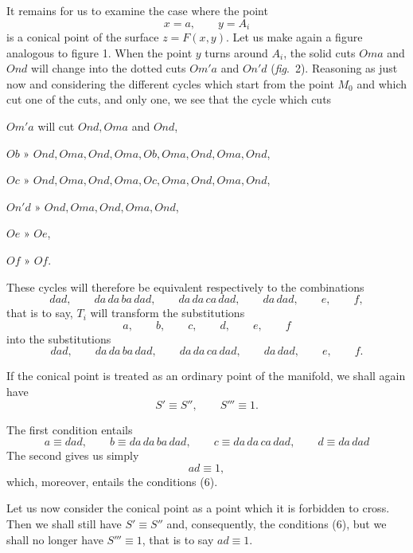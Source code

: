 \documentclass{article}
\begin{document}
It remains for us to examine the case where the point
\[ x = a, \qquad y = A_{i} \]
is a conical point of the surface $z = F(x, y)$. Let us make again a figure analogous to figure 1. When the point $y$ turns around $A_{i}$, the solid cuts $Oma$ and $Ond$ will change into the dotted cuts $Om'a$ and $On'd$ (\emph{fig}.\ 2). Reasoning
as just now and considering the different cycles
which start from the point $M_{0}$ and which cut one of the cuts, and only one, we see that the cycle which cuts

$Om'a$ will cut $Ond, Oma$ and $Ond$,

$Ob$ » $Ond, Oma, Ond, Oma, Ob, Oma, Ond, Oma, Ond$,

$Oc$ » $Ond, Oma, Ond, Oma, Oc, Oma, Ond, Oma, Ond$,

$On'd$ » $Ond, Oma, Ond, Oma, Ond$,

$Oe$ » $Oe$,

$Of$ » $Of$.

These cycles will therefore be equivalent respectively to the combinations
\[ dad, \qquad da\,da\,ba\,dad, \qquad da\,da\,ca\,dad, \qquad da\,dad, \qquad e, \qquad f, \]
that is to say, $T_{i}$ will transform the substitutions
\[ a, \qquad b, \qquad c, \qquad d, \qquad e, \qquad f \]
into the substitutions
\[ dad, \qquad da\,da\,ba\,dad, \qquad da\,da\,ca\,dad, \qquad da\,dad, \qquad e, \qquad f. \]

If the conical point is treated as an ordinary point of the manifold, we shall again have
\[ S' \equiv S'', \qquad S''' \equiv 1. \]

The first condition entails
\[ a \equiv dad, \qquad b \equiv da\,da\,ba\,dad, \qquad c \equiv da\,da\,ca\,dad, \qquad d \equiv da\,dad \tag{6} \]
The second gives us simply
\[ ad \equiv 1, \]
which, moreover, entails the conditions (6).

Let us now consider the conical point as a point which it is forbidden to cross. Then we shall still have $S' \equiv S''$ and, consequently, the conditions (6), but we shall no longer have $S''' \equiv 1$, that is to say $ad \equiv 1$.
\end{document}
